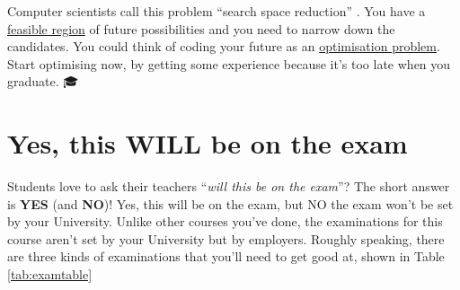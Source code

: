 \documentclass[
]{book}
\begin{document}
Computer scientists call this problem ``search space reduction'' \citep{searchspace}. You have a \href{https://en.wikipedia.org/wiki/Feasible_region}{feasible region} of future possibilities and you need to narrow down the candidates. You could think of coding your future as an \href{https://en.wikipedia.org/wiki/Optimization_problem}{optimisation problem}. Start optimising now, by getting some experience because it's too late when you graduate. 🎓

\hypertarget{exams}{%
\section{Yes, this WILL be on the exam}\label{exams}}

Students love to ask their teachers ``\emph{will this be on the exam}''? The short answer is \textbf{YES} (and \textbf{NO})! Yes, this will be on the exam, but NO the exam won't be set by your University. Unlike other courses you've done, the examinations for this course aren't set by your University but by employers. Roughly speaking, there are three kinds of examinations that you'll need to get good at, shown in Table \ref{tab:examtable}
\end{document}
